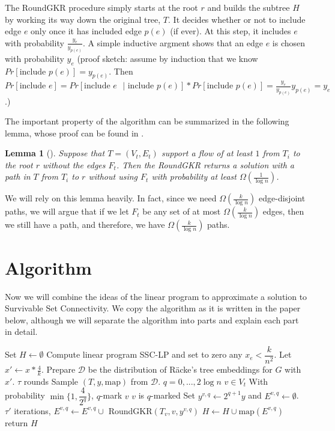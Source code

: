 \documentclass[12pt]{article}
\newtheorem{lemma}{Lemma}
\begin{document}
The RoundGKR procedure simply starts at the root $r$ and builds the subtree $H$ by working its way down the original tree, $T$. It decides whether or not to include edge $e$ only once it has included edge $p(e)$ (if ever). At this step, it includes $e$ with probability $\frac{y_e}{y_{p(e)}}$. A simple inductive argment shows that an edge $e$ is chosen with probability $y_e$ (proof sketch: assume by induction that we know $Pr[\text{include $p(e)$}] = y_{p(e)}$. Then $Pr[\text{include $e$}] = Pr[\text{include $e$ $|$ include $p(e)$}]*Pr[\text{include $p(e)$}] = \frac{y_e}{y_{p(e)}}y_{p(e)} = y_e$.)

The important property of the algorithm can be summarized in the following lemma, whose proof can be found in \cite{GKR}.

\begin{lemma}[\cite{GKR}]
\label{lem:findpath}
Suppose that $T = (V_t, E_t)$ support a flow of at least $1$ from $T_i$ to the root $r$ without the edges $F_t$. Then the RoundGKR returns a solution with a path in $T$ from $T_i$ to $r$ without using $F_t$ with probability at least $\Omega(\frac{1}{\log n})$. 
\end{lemma}

We will rely on this lemma heavily. In fact, since we need $\Omega(\frac{k}{\log n})$ edge-disjoint paths, we will argue that if we let $F_t$ be any set of at most $\Omega(\frac{k}{\log n})$ edges, then we still have a path, and therefore, we have $\Omega(\frac{k}{\log n})$ paths.  

\section{Algorithm}

Now we will combine the ideas of the linear program to approximate a solution to Survivable Set Connectivity. We copy the algorithm as it is written in the paper below, although we will separate the algorithm into parts and explain each part in detail.
\begin{codebox}
\li Set $H \leftarrow \emptyset$
\li Compute linear program SSC-LP and set to zero any $x_e < \dfrac{k}{n^2}$.
\li Let $x' \leftarrow x*\frac{4}{k}$. 
\li Prepare $\mathcal{D}$ be the distribution of R\"{a}cke's tree embeddings for $G$ with $x'$.
\li \For $\tau$ rounds \Do
\li Sample $(T, y, \text{map})$ from $\mathcal{D}$. 
\li \For $q = 0, ..., 2\log n$ \Do
\li \For $v \in V_t$ \Do
\li With probability $\min\{1, \dfrac{4}{2^q}\}$, $q$-mark $v$
\li \If $v$ is $q$-marked \Then
\li Set $y^{v, q}\leftarrow 2^{q+1}y$ and $E^{v,q} \leftarrow \emptyset$.
\li \For $\tau'$ iterations, \Do
\li $E^{v,q} \leftarrow E^{v,q} \cup$ RoundGKR$(T_v, v, y^{v,q})$ \End
\li $H \leftarrow H \cup \text{map}(E^{v,q})$ \End \End \End \End
\li return $H$
\end{codebox}
\end{document}
